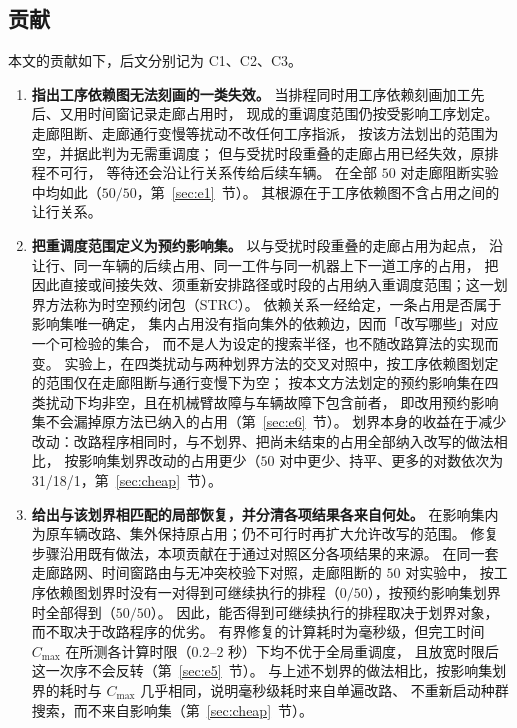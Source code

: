 \documentclass[manuscript,screen,review]{acmart}
\providecommand{\STRC}{\textsc{STRC}}
\newcommand{\NPairs}{50}
\newcommand{\PassMiss}{\NPairs/\NPairs}      %
\newcommand{\FeasRone}{0/\NPairs}            %
\newcommand{\FeasRtwo}{\NPairs/\NPairs}      %
\newcommand{\RAStabWTL}{31/18/1}     %
\begin{document}
\subsection{贡献}
\label{sec:contributions}

本文的贡献如下，后文分别记为 C1、C2、C3。

\begin{enumerate}[label=\textbf{C\arabic*.},leftmargin=2.2em,itemsep=0.4em]
\item \textbf{指出工序依赖图无法刻画的一类失效。}
当排程同时用工序依赖刻画加工先后、又用时间窗记录走廊占用时，
现成的重调度范围仍按受影响工序划定。
走廊阻断、走廊通行变慢等扰动不改任何工序指派，
按该方法划出的范围为空，并据此判为无需重调度；
但与受扰时段重叠的走廊占用已经失效，原排程不可行，
等待还会沿让行关系传给后续车辆。
在全部 \(\NPairs\) 对走廊阻断实验中均如此（\(\PassMiss\)，第~\ref{sec:e1}~节）。
其根源在于工序依赖图不含占用之间的让行关系。

\item \textbf{把重调度范围定义为预约影响集。}
以与受扰时段重叠的走廊占用为起点，
沿让行、同一车辆的后续占用、同一工件与同一机器上下一道工序的占用，
把因此直接或间接失效、须重新安排路径或时段的占用纳入重调度范围；这一划界方法称为时空预约闭包（\STRC）。
依赖关系一经给定，一条占用是否属于影响集唯一确定，
集内占用没有指向集外的依赖边，因而「改写哪些」对应一个可检验的集合，
而不是人为设定的搜索半径，也不随改路算法的实现而变。
实验上，在四类扰动与两种划界方法的交叉对照中，按工序依赖图划定的范围仅在走廊阻断与通行变慢下为空；
按本文方法划定的预约影响集在四类扰动下均非空，且在机械臂故障与车辆故障下包含前者，
即改用预约影响集不会漏掉原方法已纳入的占用（第~\ref{sec:e6}~节）。
划界本身的收益在于减少改动：改路程序相同时，与不划界、把尚未结束的占用全部纳入改写的做法相比，
按影响集划界改动的占用更少（\(\NPairs\) 对中更少、持平、更多的对数依次为 \RAStabWTL，第~\ref{sec:cheap}~节）。

\item \textbf{给出与该划界相匹配的局部恢复，并分清各项结果各来自何处。}
在影响集内为原车辆改路、集外保持原占用；仍不可行时再扩大允许改写的范围。
修复步骤沿用既有做法，本项贡献在于通过对照区分各项结果的来源。
在同一套走廊路网、时间窗路由与无冲突校验下对照，走廊阻断的 \(\NPairs\) 对实验中，
按工序依赖图划界时没有一对得到可继续执行的排程（\(\FeasRone\)），按预约影响集划界时全部得到（\(\FeasRtwo\)）。
因此，能否得到可继续执行的排程取决于划界对象，而不取决于改路程序的优劣。
有界修复的计算耗时为毫秒级，但完工时间 \(C_{\max}\) 在所测各计算时限（\(0.2\)--\(2\) 秒）下均不优于全局重调度，
且放宽时限后这一次序不会反转（第~\ref{sec:e5}~节）。
与上述不划界的做法相比，按影响集划界的耗时与 \(C_{\max}\) 几乎相同，说明毫秒级耗时来自单遍改路、
不重新启动种群搜索，而不来自影响集（第~\ref{sec:cheap}~节）。
\end{enumerate}
\end{document}
